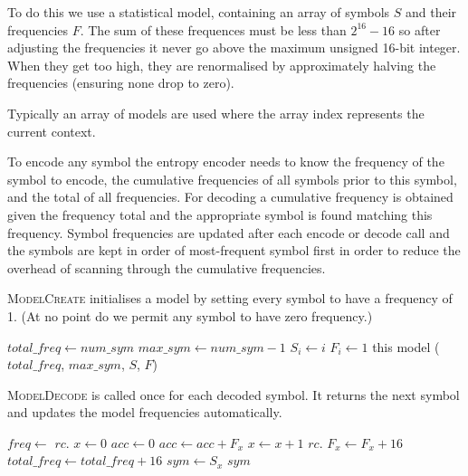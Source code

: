 \documentclass[a4paper]{article}
\begin{document}
To do this we use a statistical model, containing an array of symbols $S$ and their frequencies $F$.
The sum of these frequences must be less than $2^{16}-16$ so after adjusting the frequencies it never go above the maximum unsigned 16-bit integer.
When they get too high, they are renormalised by approximately halving the frequencies (ensuring none drop to zero).

Typically an array of models are used where the array index represents the current context.

To encode any symbol the entropy encoder needs to know the frequency of the symbol to encode, the cumulative frequencies of all symbols prior to this symbol, and the total of all frequencies.
For decoding a cumulative frequency is obtained given the frequency total and the appropriate symbol is found matching this frequency.
Symbol frequencies are updated after each encode or decode call and the symbols are kept in order of most-frequent symbol first in order to  reduce the overhead of scanning through the cumulative frequencies.

\textsc{ModelCreate} initialises a model by setting every symbol to have a frequency of 1.
(At no point do we permit any symbol to have zero frequency.)

\begin{algorithmic}[1]
  \State $total\_freq \gets num\_sym$
  \State $max\_sym \gets num\_sym-1$
    \State $S_i \gets i$
    \State $F_i \gets 1$
  \EndFor
  \State \Return this model ($total\_freq$, $max\_sym$, $S$, $F$)
\EndFunction
\end{algorithmic}

\textsc{ModelDecode} is called once for each decoded symbol.
It returns the next symbol and updates the model frequencies automatically.

\begin{algorithmic}[1]
  \State $freq \gets$ $rc.$
  \State $x \gets 0$
  \State $acc \gets 0$
    \State $acc \gets acc + F_x$
    \State $x \gets x+1$
  \EndWhile
  \State $rc.$
  \State $F_x \gets F_x + 16$ 
  \State $total\_freq \gets total\_freq + 16$
    \State {}
  \EndIf
  \State $sym \gets S_x$
    \State {}
    \State {}
  \EndIf
  \State \Return $sym$
\EndFunction
\end{algorithmic}
\end{document}
